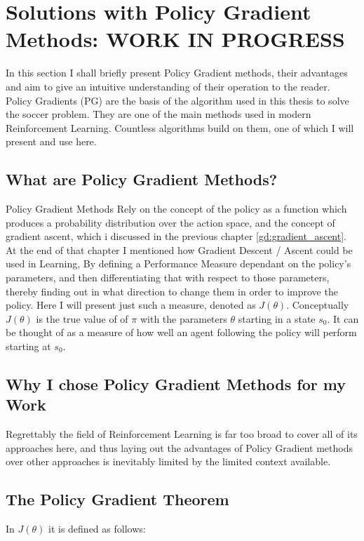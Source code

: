 \newpage
\chapter{Solutions with Policy Gradient Methods: WORK IN PROGRESS}\label{chap:policy_gradient}
\noindent
In this section I shall briefly present Policy Gradient methods, their advantages and aim to give an intuitive understanding of their operation to the reader. Policy Gradients (PG) are the basis of the algorithm used in this thesis to solve the soccer problem. They are one of the main methods used in modern Reinforcement Learning. Countless algorithms build on them, one of which I will present and use here.

\section{What are Policy Gradient Methods?}\label{pg:what_are_policy_gradient_methods}
Policy Gradient Methods Rely on the concept of the policy as a function which produces a probability distribution over the action space, and the concept of gradient ascent, which i discussed in the previous chapter \ref{gd:gradient_ascent}. At the end of that chapter I mentioned how Gradient Descent / Ascent could be used in Learning, By defining a Performance Measure dependant on the policy's parameters, and then differentiating that with respect to those parameters, thereby finding out in what direction to change them in order to improve the policy. Here I will present just such a measure, denoted as $J(\theta)$. Conceptually $J(\theta)$ is the true value of of $\pi$ with the parameters $\theta$ starting in a state $s_0$. It can be thought of as a measure of how well an agent following the policy will perform starting at $s_0$. 

\section{Why I chose Policy Gradient Methods for my Work}\label{pg:reasons_for_pg}
\noindent
Regrettably the field of Reinforcement Learning is far too broad to cover all of its approaches here, and thus laying out the advantages of Policy Gradient methods over other approaches is inevitably limited by the limited context available. 

\section{The Policy Gradient Theorem}\label{pg:theorem}
In  $J(\theta)$ it is defined as follows:

